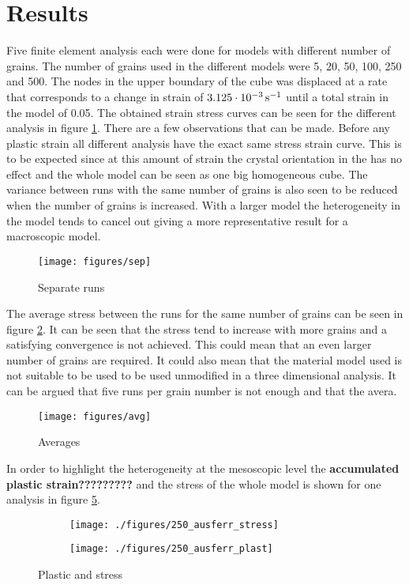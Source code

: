 \documentclass[crystal_plast.tex]{subfiles}
\begin{document}
\section{Results}

Five finite element analysis each were done for models with different number of grains. The number of grains used in the different models were 5, 20, 50, 100, 250 and 500. The nodes in the upper boundary of the cube was displaced at a rate that corresponds to a change in strain of $\unit[3.125 \cdot 10^{-3}]{s^{-1}}$ until a total strain in the model of 0.05. The obtained strain stress curves can be seen for the different analysis in figure \ref{fig:sep}. There are a few observations that can be made. Before any plastic strain all different analysis have the exact same stress strain curve. This is to be expected since at this amount of strain the crystal orientation in the has no effect and the whole model can be seen as one big homogeneous cube. The variance between runs with the same number of grains is also seen to be reduced when the number of grains is increased. With a larger model the heterogeneity in the model tends to cancel out giving a more representative result for a macroscopic model.

\begin{figure}[ht]
\centering
\texttt{[image: figures/sep]}
\caption{Separate runs}
\label{fig:sep}
\end{figure}

The average stress between the runs for the same number of grains can be seen in figure \ref{fig:avg}. It can be seen that the stress tend to increase with more grains and a satisfying convergence is not achieved. This could mean that an even larger number of grains are required. It could also mean that the material model used is not suitable to be used to be used unmodified in a three dimensional analysis. It can be argued that five runs per grain number is not enough and that the avera.

\begin{figure}[ht]
\centering
\texttt{[image: figures/avg]}
\caption{Averages}
\label{fig:avg}
\end{figure}

In order to highlight the heterogeneity at the mesoscopic level the \textbf{accumulated plastic strain?????????} and the stress of the whole model is shown for one analysis in figure \ref{fig:ausferr}. 

 \begin{figure}
\centering
\begin{subfigure}{.5\textwidth}
  \centering
  \texttt{[image: ./figures/250\_ausferr\_stress]}
  \caption{}
  \label{fig:ausferr_stress}
\end{subfigure}%
\begin{subfigure}{.5\textwidth}
  \centering
  \texttt{[image: ./figures/250\_ausferr\_plast]}
  \caption{}
  \label{fig:ausferr_plast}
\end{subfigure}
\caption{Plastic and stress}
\label{fig:ausferr}
\end{figure}



\newpage
\end{document}
